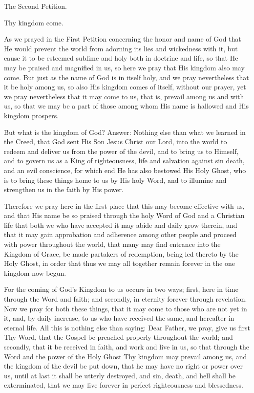 The Second Petition.

 Thy kingdom come.

As we prayed in the First Petition concerning the honor and name of God
that He would prevent the world from adorning its lies and wickedness
with it, but cause it to be esteemed sublime and holy both in doctrine
and life, so that He may be praised and magnified in us, so here we
pray that His kingdom also may come. But just as the name of God is in
itself holy, and we pray nevertheless that it be holy among us, so also
His kingdom comes of itself, without our prayer, yet we pray
nevertheless that it may come to us, that is, prevail among us and with
us, so that we may be a part of those among whom His name is hallowed
and His kingdom prospers.

But what is the kingdom of God? Answer: Nothing else than what we
learned in the Creed, that God sent His Son Jesus Christ our Lord, into
the world to redeem and deliver us from the power of the devil, and to
bring us to Himself, and to govern us as a King of righteousness, life
and salvation against sin death, and an evil conscience, for which end
He has also bestowed His Holy Ghost, who is to bring these things home
to us by His holy Word, and to illumine and strengthen us in the faith
by His power.

Therefore we pray here in the first place that this may become
effective with us, and that His name be so praised through the holy
Word of God and a Christian life that both we who have accepted it may
abide and daily grow therein, and that it may gain approbation and
adherence among other people and proceed with power throughout the
world, that many may find entrance into the Kingdom of Grace, be made
partakers of redemption, being led thereto by the Holy Ghost, in order
that thus we may all together remain forever in the one kingdom now
begun.

For the coming of God's Kingdom to us occurs in two ways; first, here
in time through the Word and faith; and secondly, in eternity forever
through revelation. Now we pray for both these things, that it may come
to those who are not yet in it, and, by daily increase, to us who have
received the same, and hereafter in eternal life. All this is nothing
else than saying: Dear Father, we pray, give us first Thy Word, that
the Gospel be preached properly throughout the world; and secondly,
that it be received in faith, and work and live in us, so that through
the Word and the power of the Holy Ghost Thy kingdom may prevail among
us, and the kingdom of the devil be put down, that he may have no right
or power over us, until at last it shall be utterly destroyed, and sin,
death, and hell shall be exterminated, that we may live forever in
perfect righteousness and blessedness.


